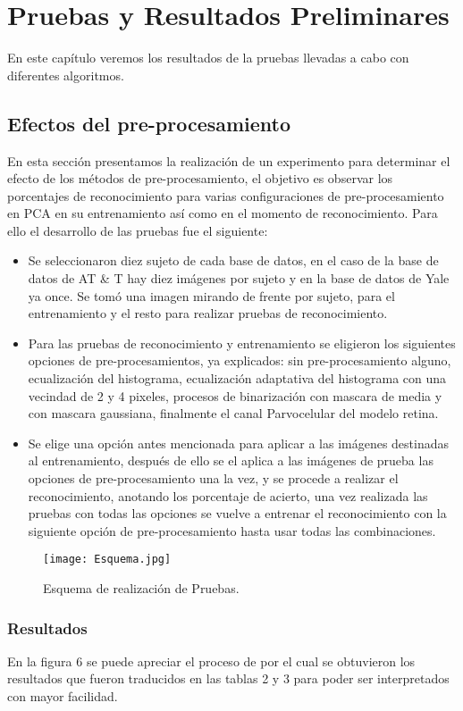 \chapter{Pruebas y Resultados Preliminares}
En este capítulo veremos los resultados de la pruebas llevadas a cabo con diferentes algoritmos.
\section{Efectos del pre-procesamiento}
En esta sección presentamos la realización de un experimento para determinar el efecto de los métodos de pre-procesamiento, el objetivo es observar los porcentajes de reconocimiento para varias configuraciones de pre-procesamiento en \ac{PCA} en su entrenamiento así como en el momento de reconocimiento.
Para ello el desarrollo de las pruebas fue el siguiente:
\begin{itemize}
\item Se seleccionaron diez sujeto de cada base de datos, en el caso de la base de datos de AT \& T hay diez imágenes por sujeto y en la base de datos de Yale ya once. Se tomó una imagen mirando de frente por sujeto, para el entrenamiento y el resto para realizar pruebas de reconocimiento.
\item Para las pruebas de reconocimiento y entrenamiento se eligieron los siguientes opciones de pre-procesamientos, ya explicados: sin pre-procesamiento alguno, ecualización del histograma, ecualización adaptativa del histograma con una vecindad de 2 y 4 pixeles, procesos de binarización con mascara de media y con mascara gaussiana, finalmente el canal Parvocelular del modelo retina.
\item Se elige una opción antes mencionada para aplicar a las imágenes destinadas al entrenamiento, después de ello se el aplica a las imágenes de prueba las opciones de pre-procesamiento una la vez, y se procede a realizar el reconocimiento, anotando los porcentaje de acierto, una vez realizada las pruebas con todas las opciones se vuelve a entrenar el reconocimiento con la siguiente opción de pre-procesamiento hasta usar todas las combinaciones.
\end{itemize}
\begin{figure}[h]
    \center
    \texttt{[image: Esquema.jpg]}
    \caption{Esquema de realización de Pruebas.}
\end{figure}
\subsection{Resultados}
En la figura 6 se puede apreciar el proceso de por el cual se obtuvieron los resultados que fueron traducidos en las tablas 2 y 3 para poder ser interpretados con mayor facilidad.
